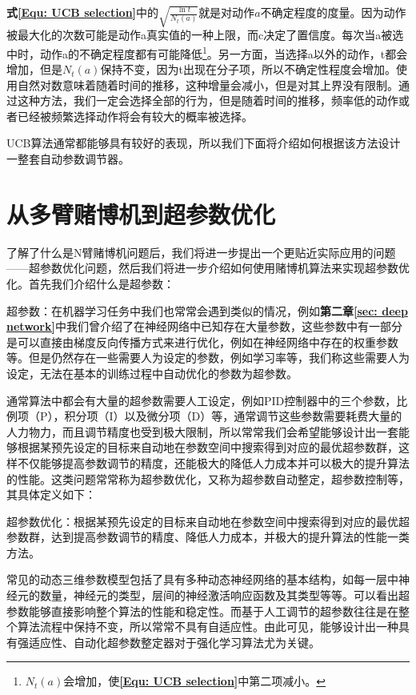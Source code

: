 \textbf{式\eqref{Equ: UCB selection}}中的$ \sqrt{\frac{\ln t}{N_{t}(a)}}$就是对动作$a$不确定程度的度量。因为动作被最大化的次数可能是动作a真实值的一种上限，而c决定了置信度。每次当a被选中时，动作a的不确定程度都有可能降低\footnote{$N_t(a)$会增加，使\textbf{\eqref{Equ: UCB selection}}中第二项减小。}。另一方面，当选择a以外的动作，t都会增加，但是$N_t(a)$保持不变，因为t出现在分子项，所以不确定性程度会增加。使用自然对数意味着随着时间的推移，这种增量会减小，但是对其上界没有限制。通过这种方法，我们一定会选择全部的行为，但是随着时间的推移，频率低的动作或者已经被频繁选择动作将会有较大的概率被选择。

UCB算法通常都能够具有较好的表现，所以我们下面将介绍如何根据该方法设计一整套自动参数调节器。

\section{从多臂赌博机到超参数优化}
了解了什么是N臂赌博机问题后，我们将进一步提出一个更贴近实际应用的问题——超参数优化问题，然后我们将进一步介绍如何使用赌博机算法来实现超参数优化。首先我们介绍什么是超参数：
\begin{Definition}
超参数：在机器学习任务中我们也常常会遇到类似的情况，例如\textbf{第二章\ref{sec: deep network}}中我们曾介绍了在神经网络中已知存在大量参数，这些参数中有一部分是可以直接由梯度反向传播方式来进行优化，例如在神经网络中存在的权重参数等。但是仍然存在一些需要人为设定的参数，例如学习率等，我们称这些需要人为设定，无法在基本的训练过程中自动优化的参数为超参数。
\end{Definition}

通常算法中都会有大量的超参数需要人工设定，例如PID控制器中的三个参数，比例项（P），积分项（I）以及微分项（D）等，通常调节这些参数需要耗费大量的人力物力，而且调节精度也受到极大限制，所以常常我们会希望能够设计出一套能够根据某预先设定的目标来自动地在参数空间中搜索得到对应的最优超参数群，这样不仅能够提高参数调节的精度，还能极大的降低人力成本并可以极大的提升算法的性能。这类问题常常称为超参数优化，又称为超参数自动整定，超参数控制等，其具体定义如下：

\begin{Definition}
超参数优化：根据某预先设定的目标来自动地在参数空间中搜索得到对应的最优超参数群，达到提高参数调节的精度、降低人力成本，并极大的提升算法的性能一类方法。
\end{Definition}

常见的动态三维参数模型包括了具有多种动态神经网络的基本结构，如每一层中神经元的数量，神经元的类型，层间的神经激活响应函数及其类型等等。可以看出超参数能够直接影响整个算法的性能和稳定性。而基于人工调节的超参数往往是在整个算法流程中保持不变，所以常常不具有自适应性。由此可见，能够设计出一种具有强适应性、自动化超参数整定器对于强化学习算法尤为关键。

